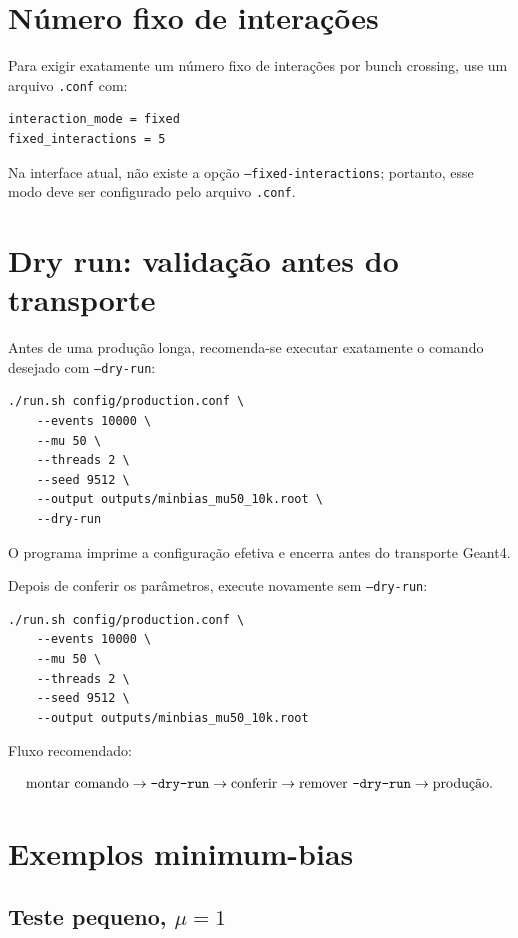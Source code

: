 \documentclass[11pt,a4paper]{article}
\begin{document}
\section{Número fixo de interações}

Para exigir exatamente um número fixo de interações por bunch crossing, use um
arquivo \texttt{.conf} com:

\begin{lstlisting}[style=config]
interaction_mode = fixed
fixed_interactions = 5
\end{lstlisting}

Na interface atual, não existe a opção
\texttt{--fixed-interactions}; portanto, esse modo deve ser configurado pelo
arquivo \texttt{.conf}.

\section{Dry run: validação antes do transporte}

Antes de uma produção longa, recomenda-se executar exatamente o comando desejado
com \texttt{--dry-run}:

\begin{lstlisting}[style=shell]
./run.sh config/production.conf \
    --events 10000 \
    --mu 50 \
    --threads 2 \
    --seed 9512 \
    --output outputs/minbias_mu50_10k.root \
    --dry-run
\end{lstlisting}

O programa imprime a configuração efetiva e encerra antes do transporte Geant4.

Depois de conferir os parâmetros, execute novamente sem
\texttt{--dry-run}:

\begin{lstlisting}[style=shell]
./run.sh config/production.conf \
    --events 10000 \
    --mu 50 \
    --threads 2 \
    --seed 9512 \
    --output outputs/minbias_mu50_10k.root
\end{lstlisting}

Fluxo recomendado:

\[
\text{montar comando}
\rightarrow
\texttt{--dry-run}
\rightarrow
\text{conferir}
\rightarrow
\text{remover \texttt{--dry-run}}
\rightarrow
\text{produção}.
\]

\section{Exemplos minimum-bias}

\subsection{Teste pequeno, \texorpdfstring{$\mu=1$}{mu=1}}
\end{document}
